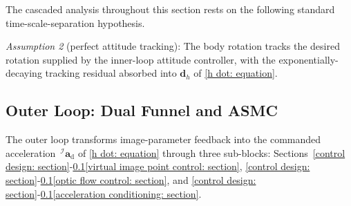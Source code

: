 
The cascaded analysis throughout this section rests on the following standard time-scale-separation hypothesis.

\textit{Assumption 2} (perfect attitude tracking): The body rotation tracks the desired rotation supplied by the inner-loop attitude controller, with the exponentially-decaying tracking residual absorbed into $\boldsymbol{d}_h$ of \eqref{h dot: equation}.


\subsection{Outer Loop: Dual Funnel and ASMC} \label{outer loop: section}
The outer loop transforms image-parameter feedback into the commanded acceleration $\,^\mathcal{I}\boldsymbol{a}_\text{d}$ of \eqref{h dot: equation} through three sub-blocks: Sections~\ref{control design: section}-\ref{outer loop: section}\ref{virtual image point control: section}, \ref{control design: section}-\ref{outer loop: section}\ref{optic flow control: section}, and \ref{control design: section}-\ref{outer loop: section}\ref{acceleration conditioning: section}.

